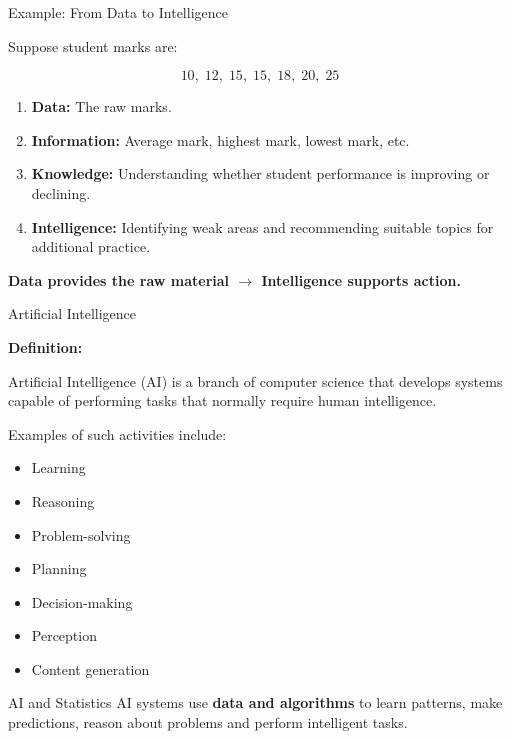\documentclass[aspectratio=169]{beamer}
\begin{document}
\begin{frame}{Example: From Data to Intelligence}

Suppose student marks are:

\[
10,\;12,\;15,\;15,\;18,\;20,\;25
\]

\begin{enumerate}
    \item \textbf{Data:} The raw marks.
    \item \textbf{Information:} Average mark, highest mark, lowest mark, etc.
    \item \textbf{Knowledge:} Understanding whether student performance is improving or declining.
    \item \textbf{Intelligence:} Identifying weak areas and recommending suitable topics for additional practice.
\end{enumerate}

\vspace{0.3cm}

\begin{center}
\textbf{Data provides the raw material $\rightarrow$ Intelligence supports action.}
\end{center}
\end{frame}

\begin{frame}{Artificial Intelligence}

\textbf{Definition:}

Artificial Intelligence (AI) is a branch of computer science that
develops systems capable of performing tasks that normally require
human intelligence.

\vspace{0.3cm}

Examples of such activities include:

\begin{itemize}
    \item Learning
    \item Reasoning
    \item Problem-solving
    \item Planning
    \item Decision-making
    \item Perception
    \item Content generation
\end{itemize}

\vspace{0.3cm}

\begin{block}{AI and Statistics}
AI systems use \textbf{data and algorithms} to learn patterns,
make predictions, reason about problems and perform intelligent tasks.
\end{block}
\end{frame}
\end{document}
